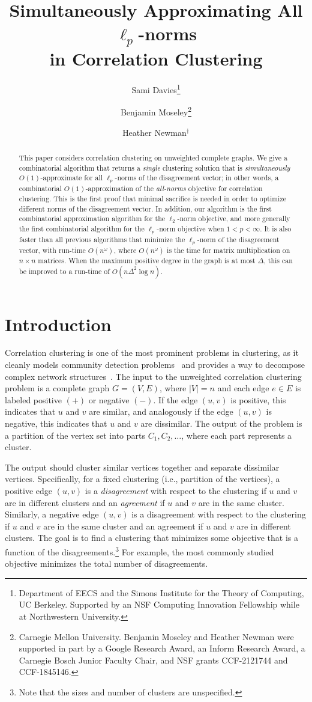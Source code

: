 \documentclass[11pt]{article}
\title{Simultaneously Approximating All $\ell_p$-norms\\ in Correlation Clustering }
\date{}
\author{Sami Davies\thanks{Department of EECS and the Simons Institute for the Theory of Computing, UC Berkeley. Supported by an NSF Computing Innovation Fellowship while at Northwestern University.} \and Benjamin Moseley\thanks{Carnegie Mellon University. Benjamin Moseley and Heather Newman were supported in part by  a Google Research Award, an Inform Research Award, a Carnegie Bosch Junior Faculty Chair, and NSF grants CCF-2121744  and  CCF-1845146.} \and Heather Newman$^\dagger$}
\begin{document}
\maketitle



\begin{abstract}This paper considers correlation clustering on unweighted complete graphs. We give a combinatorial algorithm that returns a \emph{single} clustering solution that is \emph{simultaneously} $O(1)$-approximate for all $\ell_p$-norms of the disagreement vector;
in other words, a combinatorial $O(1)$-approximation of the \emph{all-norms} objective for correlation clustering.
This is the first proof that minimal sacrifice is needed in order to optimize different norms of the disagreement vector. In addition, our algorithm is the first combinatorial approximation algorithm for the $\ell_2$-norm objective, and more generally the first combinatorial algorithm for the $\ell_p$-norm objective when $1 < p < \infty$. 
It is also faster than all previous algorithms that minimize the $\ell_p$-norm of the disagreement vector, with run-time $O(n^\omega)$, where $O(n^\omega)$ is the time for matrix multiplication on $n \times n$ matrices. 
When the maximum positive degree in the graph is at most $\Delta$, this can be improved to a run-time of $O(n\Delta^2 \log n)$. 
\end{abstract}



\section{Introduction}
Correlation clustering is one of the most prominent problems in clustering, 
as it cleanly models community detection problems~\cite{veldt2018, SDELM21} and provides a way to decompose complex network structures~\cite{Wirth17, mccallum2004conditional}. 
The input to the unweighted correlation clustering problem is a complete graph $G=(V,E)$, where $|V|=n$ and each edge $e \in E$ is labeled positive $(+)$ or negative $(-)$.  
If the edge $(u,v)$ is positive, this indicates that $u$ and $v$ are similar, 
and analogously if the edge $(u,v)$ is negative, this indicates that $u$ and $v$ are dissimilar. 
The output of the problem is a partition of the vertex set into parts $C_1, C_2, \ldots$, where each part represents a cluster.   

The output should cluster similar vertices together and separate dissimilar vertices.
Specifically, for a fixed clustering (i.e., partition of the vertices), a positive edge $(u, v)$ is a \emph{disagreement} with respect to the clustering if $u$ and $v$ are in different clusters and an \emph{agreement} if $u$ and $v$ are in the same cluster.
Similarly, a negative edge $(u,v)$ is a disagreement with respect to the clustering if $u$ and $v$ are in the same cluster 
and an agreement if $u$ and $v$ are in different clusters.  
The goal is to find a clustering that minimizes some objective
that is a function of the disagreements.\footnote{Note that the sizes and number of clusters are unspecified.}
For example, the most commonly studied objective minimizes the total number of disagreements.
\end{document}
